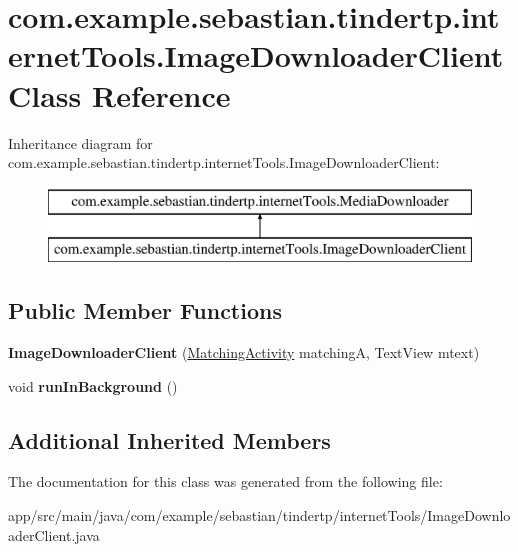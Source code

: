 \hypertarget{classcom_1_1example_1_1sebastian_1_1tindertp_1_1internetTools_1_1ImageDownloaderClient}{}\section{com.\+example.\+sebastian.\+tindertp.\+internet\+Tools.\+Image\+Downloader\+Client Class Reference}
\label{classcom_1_1example_1_1sebastian_1_1tindertp_1_1internetTools_1_1ImageDownloaderClient}
Inheritance diagram for com.\+example.\+sebastian.\+tindertp.\+internet\+Tools.\+Image\+Downloader\+Client\+:\begin{figure}[H]
\begin{center}
\leavevmode
\includegraphics[height=2.000000cm]{classcom_1_1example_1_1sebastian_1_1tindertp_1_1internetTools_1_1ImageDownloaderClient}
\end{center}
\end{figure}
\subsection*{Public Member Functions}
\begin{DoxyCompactItemize}
\item 
{\bfseries Image\+Downloader\+Client} (\hyperlink{classcom_1_1example_1_1sebastian_1_1tindertp_1_1MatchingActivity}{Matching\+Activity} matchingA, Text\+View mtext)\hypertarget{classcom_1_1example_1_1sebastian_1_1tindertp_1_1internetTools_1_1ImageDownloaderClient_ac8ca1a959cf1c820b81ecac2d01092d2}{}\label{classcom_1_1example_1_1sebastian_1_1tindertp_1_1internetTools_1_1ImageDownloaderClient_ac8ca1a959cf1c820b81ecac2d01092d2}

\item 
void {\bfseries run\+In\+Background} ()\hypertarget{classcom_1_1example_1_1sebastian_1_1tindertp_1_1internetTools_1_1ImageDownloaderClient_a2e711337c47bd788c2de219bb3c7d8e3}{}\label{classcom_1_1example_1_1sebastian_1_1tindertp_1_1internetTools_1_1ImageDownloaderClient_a2e711337c47bd788c2de219bb3c7d8e3}

\end{DoxyCompactItemize}
\subsection*{Additional Inherited Members}


The documentation for this class was generated from the following file\+:\begin{DoxyCompactItemize}
\item 
app/src/main/java/com/example/sebastian/tindertp/internet\+Tools/Image\+Downloader\+Client.\+java\end{DoxyCompactItemize}
